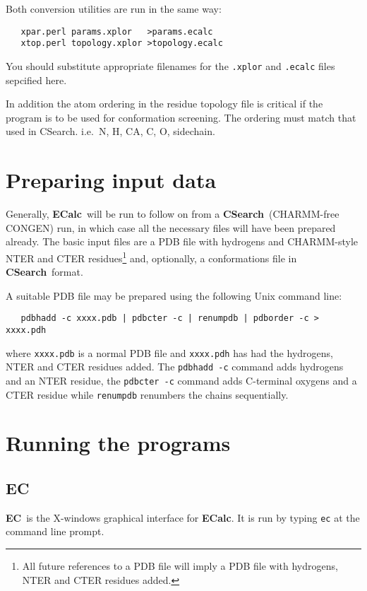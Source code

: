 \documentclass[12pt]{article}
\newcommand{\ecalc}{\mbox{\bf ECalc}}
\newcommand{\ec}{\mbox{\bf EC}}
\newcommand{\csearch}{\mbox{\bf CSearch}}
\begin{document}
Both conversion utilities are run in the same way:
\begin{verbatim}
   xpar.perl params.xplor   >params.ecalc
   xtop.perl topology.xplor >topology.ecalc
\end{verbatim}
You should substitute appropriate filenames for the {\tt .xplor} and
{\tt .ecalc} files sepcified here.

In addition the atom ordering in the residue topology file is critical
if the program is to be used for conformation screening. The ordering
must match that used in CSearch. i.e.\ N, H, CA, C, O, sidechain.


\section{Preparing input data}
\label{sec:data}

Generally, \ecalc\ will be run to follow on from a \csearch\
(CHARMM-free CONGEN) run, in which case all the necessary files will
have been prepared already. The basic input files are a PDB file with
hydrogens and CHARMM-style NTER and CTER residues\footnote{All future
references to a PDB file will imply a PDB file with hydrogens, NTER
and CTER residues added.} and, optionally, a conformations file in
\csearch\ format.

A suitable PDB file may be prepared using the following Unix command
line:
\begin{verbatim}
   pdbhadd -c xxxx.pdb | pdbcter -c | renumpdb | pdborder -c > xxxx.pdh
\end{verbatim}
where {\tt xxxx.pdb} is a normal PDB file and {\tt xxxx.pdh} has had the
hydrogens, NTER and CTER residues added. The {\tt pdbhadd -c} command
adds hydrogens and an NTER residue, the {\tt pdbcter -c} command adds 
C-terminal oxygens and a CTER residue while {\tt renumpdb} renumbers
the chains sequentially.

\section{Running the programs}

\subsection{EC}
\ec\ is the X-windows graphical interface for \ecalc. It is run by
typing {\tt ec} at the command line prompt.
\end{document}
